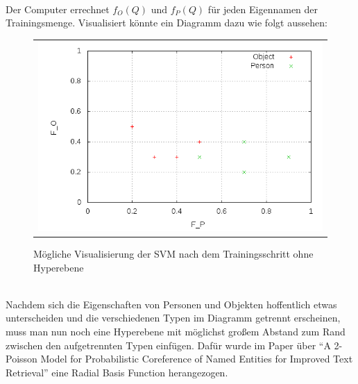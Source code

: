 \\
Der Computer errechnet $f_O\left( Q \right)\text{ und } f_P\left( Q \right)$ für jeden Eigennamen der Trainingsmenge. Visualisiert könnte ein Diagramm dazu wie folgt aussehen:
\begin{figure}[h]
	\centering
	\begin{tabular}{c}
		\includegraphics[scale=0.5]{pics/svm_training}
	\end{tabular}
	\caption{Mögliche Visualisierung der SVM nach dem Trainingsschritt ohne Hyperebene}
	\label{tab:svm_training}
\end{figure}\\
Nachdem sich die Eigenschaften von Personen und Objekten hoffentlich etwas unterscheiden und die verschiedenen Typen im Diagramm getrennt erscheinen, muss man nun noch eine Hyperebene mit möglichst großem Abstand zum Rand zwischen den aufgetrennten Typen einfügen. Dafür wurde im Paper über ``A 2-Poisson Model for Probabilistic Coreference of Named Entities for Improved Text Retrieval'' \cite{paper:Na} eine Radial Basis Function herangezogen. 
